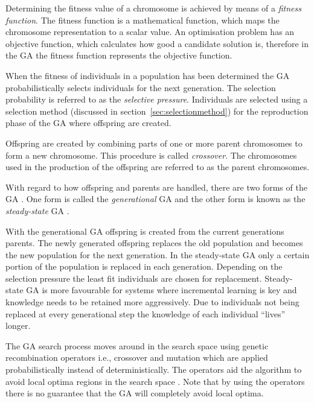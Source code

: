 Determining the fitness value of a chromosome is achieved by means of a \emph{fitness function}. The fitness function is a mathematical function, which maps the chromosome representation to a scalar value\cite{CompuIntelligenceIntro}. An optimisation problem has an objective function, which calculates how good a candidate solution is, therefore in the \gls{GA} the fitness function represents the objective function\cite{CompuIntelligenceIntro}.

When the fitness of individuals in a population has been determined the \gls{GA} probabilistically selects individuals for the next generation\cite{CompuIntelligenceIntro}. The selection probability is referred to as the \emph{selective pressure}\cite{CompuIntelligenceIntro}. Individuals are selected using a selection method (discussed in section~\ref{sec:selectionmethod}) for the reproduction phase of the \gls{GA} where offspring are created\cite{CompuIntelligenceIntro}.

Offspring are created by combining parts of one or more parent chromosomes to form a new chromosome. This procedure is called \emph{crossover}\cite{CompuIntelligenceIntro}. The chromosomes used in the production of the offspring are referred to as the parent chromosomes\cite{CompuIntelligenceIntro}.

With regard to how offspring and parents are handled, there are two forms of the \gls{GA} \cite{FamilyGA}. One form is called the \emph{generational} \gls{GA}  and the other form is known as the \emph{steady-state} \gls{GA} \cite{GeostatisticalGA,FamilyGA}.

With the generational \gls{GA} offspring is created from the current generations parents. The newly generated offspring replaces the old population and becomes the new population for the next generation\cite{FamilyGA, SpringerIntroToGAs, IntroToGAs}. In the steady-state \gls{GA} only a certain portion of the population is replaced in each generation. Depending on the selection pressure the least fit individuals are chosen for replacement\cite{GeostatisticalGA,FamilyGA, SpringerIntroToGAs, IntroToGAs}. Steady-state \gls{GA} is more favourable for systems where incremental learning is key and knowledge needs to be retained more aggressively\cite{SpringerIntroToGAs, IntroToGAs}. Due to individuals not being replaced at every generational step the knowledge of each individual ``lives'' longer\cite{SpringerIntroToGAs, IntroToGAs}.

The \gls{GA} search process moves around in the search space using genetic recombination operators i.e., crossover and mutation which are applied probabilistically instead of deterministically\cite{FamilyGA}. The operators aid the algorithm to avoid local optima regions in the search space \cite{HybridIntelliGA}. Note that by using the operators there is no guarantee that the \gls{GA} will completely avoid local optima\cite{CompuIntelligenceIntro}.

